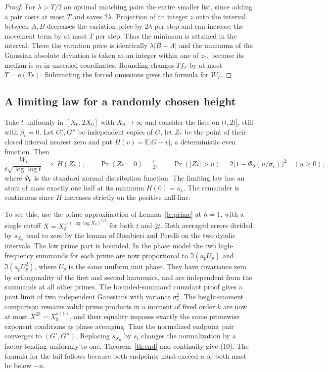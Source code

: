\documentclass[11pt]{article}
\newcommand{\E}{\mathbb E}
\begin{document}
\begin{proof}
For $\lambda>T/2$ an optimal matching pairs the entire smaller list, since adding a pair costs at most $T$ and saves $2\lambda$. Projection of an integer $z$ onto the interval between $A,B$ decreases the variation price by $2\lambda$ per step and can increase the movement term by at most $T$ per step. Thus the minimum is attained in the interval. There the variation price is identically $\lambda|B-A|$ and the minimum of the Gaussian absolute deviation is taken at an integer within one of $z_*$, because its median is $m$ in unscaled coordinates. Rounding changes $Tf_T$ by at most $T=o(Ts)$. Subtracting the forced omissions gives the formula for $W_T$.
\end{proof}

\subsection*{A limiting law for a randomly chosen height}
Take $t$ uniformly in $[X_0,2X_0]$ with $X_0\to\infty$ and consider the lists on $(t,2t]$, still with $\beta_c=0$. Let $G',G''$ be independent copies of $G$, let $Z_*$ be the point of their closed interval nearest zero and put $H(v)=\E|G-v|$, a deterministic even function. Then
\[
 \frac{W_t}{t\sqrt{\log\log t}}\ \Longrightarrow\ H(Z_*),\qquad
 \Pr(Z_*=0)=\tfrac12,\qquad
 \Pr(|Z_*|>u)=2\bigl(1-\Phi_0(u/\sigma_c)\bigr)^2\quad(u\ge0),       \tag{10}
\]
where $\Phi_0$ is the standard normal distribution function. The limiting law has an atom of mass exactly one half at its minimum $H(0)=\kappa_c$. The remainder is continuous since $H$ increases strictly on the positive half-line.

To see this, use the prime approximation of Lemma~\ref{le:prime} at $h=1$, with a single cutoff $X=X_0^{1/(\log\log X_0)^{1/4}}$ for both $t$ and $2t$. Both averaged errors divided by $s_{X_0}$ tend to zero by the lemma of Bombieri and Perelli on the two dyadic intervals. The low prime part is bounded. In the phase model the two high-frequency summands for each prime are now proportional to
$\Im(a_p U_p)$ and $\Im(a_p U_p^2)$, where $U_p$ is the same uniform unit phase. They have covariance zero by orthogonality of the first and second harmonics, and are independent from the summands at all other primes. The bounded-summand cumulant proof gives a joint limit of two independent Gaussians with variance $\sigma_c^2$. The height-moment comparison remains valid: prime products in a moment of fixed order $k$ are now at most $X^{2k}=X_0^{o(1)}$, and their equality imposes exactly the same primewise exponent conditions as phase averaging. Thus the normalized endpoint pair converges to $(G',G'')$. Replacing $s_{X_0}$ by $s_t$ changes the normalization by a factor tending uniformly to one. Theorem~\ref{th:end} and continuity give (10). The formula for the tail follows because both endpoints must exceed $u$ or both must be below $-u$.
\end{document}
